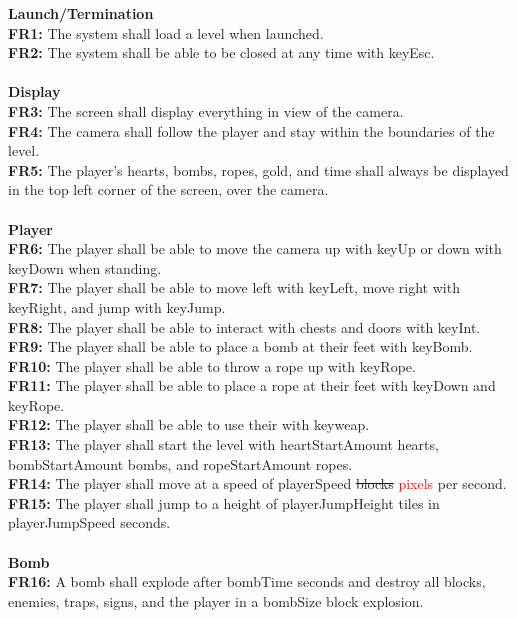 \documentclass[12pt, titlepage]{article}
\begin{document}
\textbf{Launch/Termination}\\
\textbf{FR1:} The system shall load a level when launched.\\
\textbf{FR2:} The system shall be able to be closed at any time with keyEsc.\\ 
\\
\textbf{Display}\\
\textbf{FR3:} The screen shall display everything in view of the camera.\\
\textbf{FR4:} The camera shall follow the player and stay within the boundaries of the level.\\
\textbf{FR5:} The player's hearts, bombs, ropes, gold, and time shall always be displayed in the top left corner of the screen, over the camera.\\
\\
\textbf{Player}\\
\textbf{FR6:} The player shall be able to move the camera up with keyUp or down with keyDown when standing.\\
\textbf{FR7:} The player shall be able to move left with keyLeft, move right with keyRight, and jump with keyJump.\\
\textbf{FR8:} The player shall be able to interact with chests and doors with keyInt.\\
\textbf{FR9:} The player shall be able to place a bomb at their feet with keyBomb.\\
\textbf{FR10:} The player shall be able to throw a rope up with keyRope.\\
\textbf{FR11:} The player shall be able to place a rope at their feet with keyDown and keyRope.\\
\textbf{FR12:} The player shall be able to use their with keyweap.\\
\textbf{FR13:} The player shall start the level with heartStartAmount hearts, bombStartAmount bombs, and ropeStartAmount ropes.\\
\textbf{FR14:} The player shall move at a speed of playerSpeed \st{blocks} \textcolor{red}{pixels} per second.\\
\textbf{FR15:} The player shall jump to a height of playerJumpHeight tiles in playerJumpSpeed seconds.\\
\\
\textbf{Bomb}\\
\textbf{FR16:} A bomb shall explode after bombTime seconds and destroy all blocks, enemies, traps, signs, and the player in a bombSize block explosion.\\
\end{document}
